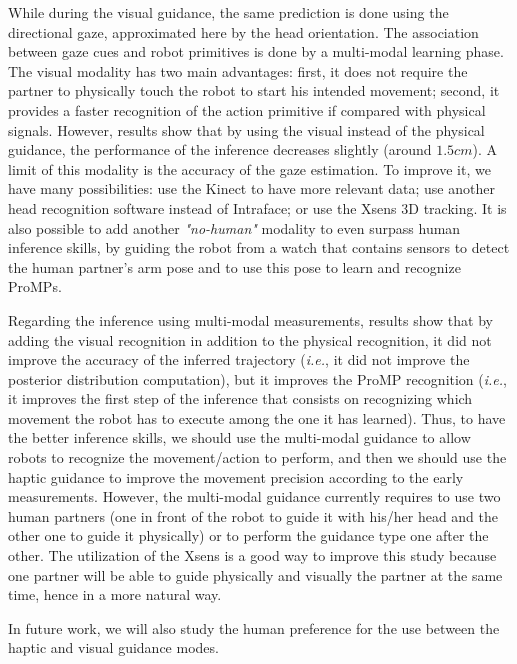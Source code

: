 \documentclass[runningheads,a4paper]{llncs}
\begin{document}
While during the visual guidance, the same prediction is done using the directional gaze, approximated here by the head orientation. The association between gaze cues and robot primitives is done by a multi-modal learning phase.
The visual modality has two main advantages: first, it does not require the partner to physically touch the robot to start his intended movement; second, it provides a faster recognition of the action primitive if compared with physical signals. However, results show that by using the visual instead of the physical guidance, the performance of the inference decreases slightly (around $1.5cm$).
A limit of this modality is the accuracy of the gaze estimation. To improve it, we have many possibilities: use the Kinect to have more relevant data; use another head recognition software instead of Intraface; or use the  Xsens 3D tracking. 
It is also possible to add another \textit{"no-human"} modality to even surpass human inference skills, by guiding the robot from a watch that contains sensors to detect the human partner's arm pose and to use this pose to learn and recognize ProMPs. 

Regarding the inference using multi-modal measurements, results show that by adding the visual recognition in addition to the physical recognition, it did not improve the accuracy of the inferred trajectory (\textit{i.e.}, it did not improve the posterior distribution computation), but it improves the ProMP recognition (\textit{i.e.}, it improves the first step of the inference that consists on recognizing which movement the robot has to execute among the one it has learned). Thus, to have the better inference skills, we should use the multi-modal guidance to allow robots to recognize the movement/action to perform, and then we should use the haptic guidance to improve the movement precision according to the early measurements. However, the multi-modal guidance currently requires to use two human partners (one in front of the robot to guide it with his/her head and the other one to guide it physically) or to perform the guidance type one after the other. The utilization of the Xsens is a good way to improve this study because one partner will be able to guide physically and visually the partner at the same time, hence in a more natural way.

In future work, we will also study the human preference for the use between the haptic and visual guidance modes. 

\end{document}
